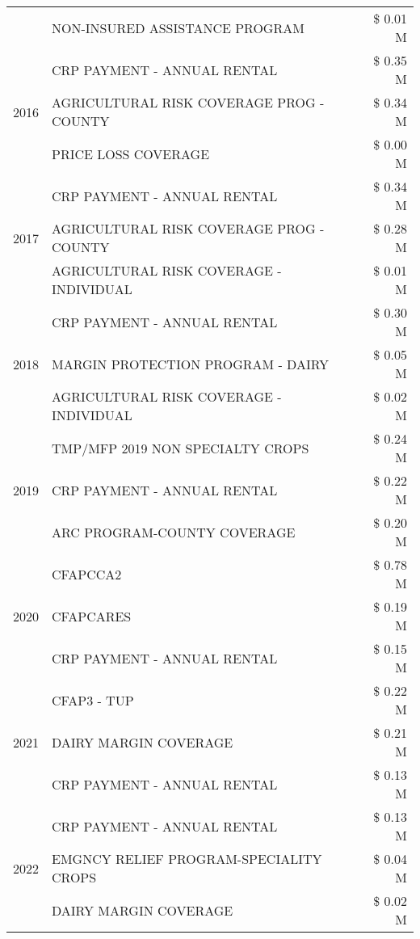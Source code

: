 \begin{tabular}{llr}
 & NON-INSURED ASSISTANCE PROGRAM & \$ 0.01 M \\
\cline{1-3}
\multirow[t]{3}{*}{2016} & CRP PAYMENT - ANNUAL RENTAL & \$ 0.35 M \\
 & AGRICULTURAL RISK COVERAGE PROG - COUNTY & \$ 0.34 M \\
 & PRICE LOSS COVERAGE & \$ 0.00 M \\
\cline{1-3}
\multirow[t]{3}{*}{2017} & CRP PAYMENT - ANNUAL RENTAL & \$ 0.34 M \\
 & AGRICULTURAL RISK COVERAGE PROG - COUNTY & \$ 0.28 M \\
 & AGRICULTURAL RISK COVERAGE - INDIVIDUAL & \$ 0.01 M \\
\cline{1-3}
\multirow[t]{3}{*}{2018} & CRP PAYMENT - ANNUAL RENTAL & \$ 0.30 M \\
 & MARGIN PROTECTION PROGRAM - DAIRY & \$ 0.05 M \\
 & AGRICULTURAL RISK COVERAGE - INDIVIDUAL & \$ 0.02 M \\
\cline{1-3}
\multirow[t]{3}{*}{2019} & TMP/MFP 2019 NON SPECIALTY CROPS & \$ 0.24 M \\
 & CRP PAYMENT - ANNUAL RENTAL & \$ 0.22 M \\
 & ARC PROGRAM-COUNTY COVERAGE & \$ 0.20 M \\
\cline{1-3}
\multirow[t]{3}{*}{2020} & CFAPCCA2 & \$ 0.78 M \\
 & CFAPCARES & \$ 0.19 M \\
 & CRP PAYMENT - ANNUAL RENTAL & \$ 0.15 M \\
\cline{1-3}
\multirow[t]{3}{*}{2021} & CFAP3 - TUP & \$ 0.22 M \\
 & DAIRY MARGIN COVERAGE & \$ 0.21 M \\
 & CRP PAYMENT - ANNUAL RENTAL & \$ 0.13 M \\
\cline{1-3}
\multirow[t]{3}{*}{2022} & CRP PAYMENT - ANNUAL RENTAL & \$ 0.13 M \\
 & EMGNCY RELIEF PROGRAM-SPECIALITY CROPS & \$ 0.04 M \\
 & DAIRY MARGIN COVERAGE & \$ 0.02 M \\
\cline{1-3}
\bottomrule
\end{tabular}
